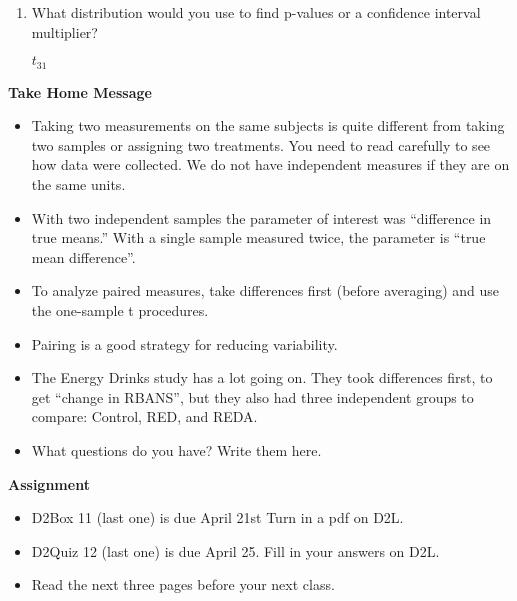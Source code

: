 \begin{enumerate}
\begin{enumerate}
\begin{key}
  {\it Take difference in weight gain (diet minus sugar) for each person.}
\end{key}
\item What distribution would you use to find p-values or
    a confidence interval multiplier?
\begin{students}
\vspace{2cm}\newpage
\end{students}

\begin{key}
  {\it $t_{31}$}
\end{key}
\end{enumerate}

\end{enumerate}


\begin{center}
  {\large\bf Take Home Message}
\end{center}
\begin{itemize}
\item Taking two measurements on the same subjects is quite different
  from taking two samples or assigning two treatments. You need to
  read carefully to see how data were collected.  We do not have
  independent measures if they are on the same units.

  \item With two independent samples the parameter of interest was
    ``difference in true means.''  With a single sample measured
    twice, the parameter is ``true mean difference''.

  \item To analyze paired measures, take differences first (before
    averaging) and use the one-sample t procedures.

  \item Pairing is a good strategy for reducing variability.

  \item The Energy Drinks study has a lot going on.  They took
    differences first, to get ``change in RBANS'', but they also had
    three independent groups to compare: Control, RED, and REDA.

  \item What  questions do you have?  Write them here.\vfill
\end{itemize}



\begin{center}
  {\large\bf Assignment}
\end{center}

\begin{itemize}
\item D2Box 11 (last one) is due April 21st Turn in a pdf on D2L.
\item D2Quiz 12 (last one) is due April 25.  Fill in your answers on D2L.
\item Read the next three pages before your next class.
\end{itemize}
